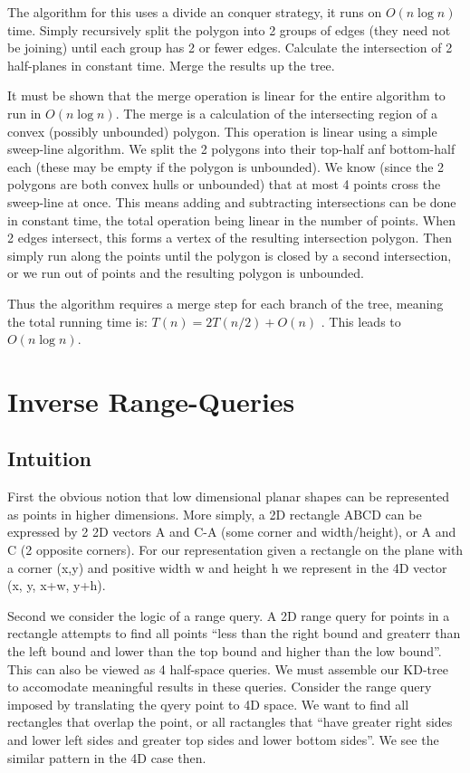 The algorithm for this uses a divide an conquer strategy, it runs on $O(n \log n)$ time.
Simply recursively split the polygon into 2 groups of edges (they need not be joining) until each group has 2 or fewer edges.
Calculate the intersection of 2 half-planes in constant time.
Merge the results up the tree.

It must be shown that the merge operation is linear for the entire algorithm to run in $O(n \log n)$.
The merge is a calculation of the intersecting region of a convex (possibly unbounded) polygon.
This operation is linear using a simple sweep-line algorithm.
We split the 2 polygons into their top-half anf bottom-half each (these may be empty if the polygon is unbounded).
We know (since the 2 polygons are both convex hulls or unbounded) that at most 4 points cross the sweep-line at once.
This means adding and subtracting intersections can be done in constant time, the total operation being linear in the number of points.
When 2 edges intersect, this forms a vertex of the resulting intersection polygon.
Then simply run along the points until the polygon is closed by a second intersection, or we run out of points and the resulting polygon is unbounded.

Thus the algorithm requires a merge step for each branch of the tree, meaning the total running time is: $T(n) = 2T(n/2) + O(n)$ \cite{hpi}.
This leads to $O(n \log n)$.

\section {Inverse Range-Queries}

\subsection{Intuition}
First the obvious notion that low dimensional planar shapes can be represented as points in higher dimensions.
More simply, a 2D rectangle ABCD can be expressed by 2 2D vectors A and C-A (some corner and width/height), or A and C (2 opposite corners).
For our representation given a rectangle on the plane with a corner (x,y) and positive width w and height h we represent in the 4D vector (x, y, x+w, y+h).

Second we consider the logic of a range query.
A 2D range query for points in a rectangle attempts to find all points ``less than the right bound and greaterr than the left bound and lower than the top bound and higher than the low bound''.
This can also be viewed as 4 half-space queries.
We must assemble our KD-tree to accomodate meaningful results in these queries.
Consider the range query imposed by translating the qyery point to 4D space.
We want to find all rectangles that overlap the point, or all ractangles that ``have greater right sides and lower left sides and greater top sides and lower bottom sides''.
We see the similar pattern in the 4D case then.

